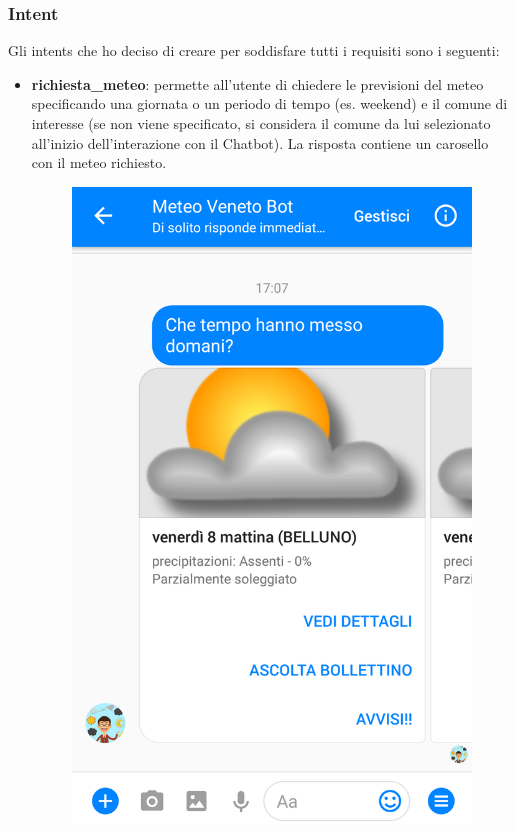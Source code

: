 \subsubsection{Intent}
Gli intents che ho deciso di creare per soddisfare tutti i requisiti sono i seguenti:
\begin{itemize}
	\item \textbf{richiesta\_meteo}: permette all'utente di chiedere le previsioni del meteo specificando una giornata o un periodo di tempo (es. weekend) e il comune di interesse (se non viene specificato, si considera il comune da lui selezionato all'inizio dell'interazione con il \gls{Chatbot}). La risposta contiene un carosello con il meteo richiesto.
	\begin{figure}[h]
		\centering
		\includegraphics[scale=0.15]{../Immagini/richiesta_meteo.png}

\end{figure}
\end{itemize}
